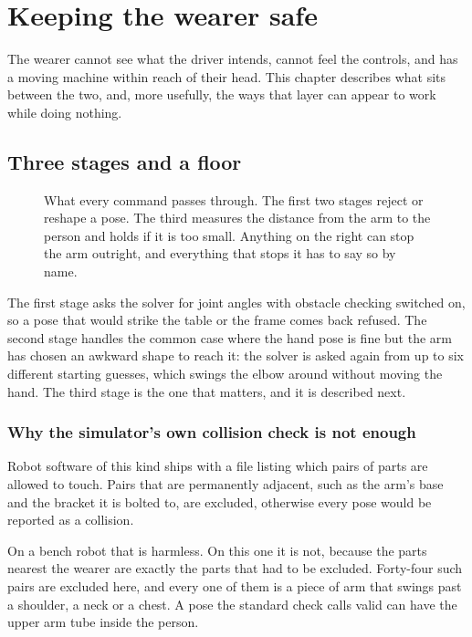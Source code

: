 \chapter{Keeping the wearer safe}
\label{ch:safety}

The wearer cannot see what the driver intends, cannot feel the controls, and
has a moving machine within reach of their head. This chapter describes what
sits between the two, and, more usefully, the ways that layer can appear to
work while doing nothing.

\section{Three stages and a floor}

\begin{figure}[htbp]
  \centering
  
  \caption[The safety layers]{What every command passes through. The first two
  stages reject or reshape a pose. The third measures the distance from the
  arm to the person and holds if it is too small. Anything on the right can
  stop the arm outright, and everything that stops it has to say so by name.}
  \label{fig:safety}
\end{figure}

The first stage asks the solver for joint angles with obstacle checking
switched on, so a pose that would strike the table or the frame comes back
refused. The second stage handles the common case where the hand pose is fine
but the arm has chosen an awkward shape to reach it: the solver is asked again
from up to six different starting guesses, which swings the elbow around
without moving the hand. The third stage is the one that matters, and it is
described next.

\subsection{Why the simulator's own collision check is not enough}

Robot software of this kind ships with a file listing which pairs of parts are
allowed to touch. Pairs that are permanently adjacent, such as the arm's base
and the bracket it is bolted to, are excluded, otherwise every pose would be
reported as a collision.

On a bench robot that is harmless. On this one it is not, because the parts
nearest the wearer are exactly the parts that had to be excluded. Forty-four
such pairs are excluded here, and every one of them is a piece of arm that
swings past a shoulder, a neck or a chest. A pose the standard check calls
valid can have the upper arm tube inside the person.

